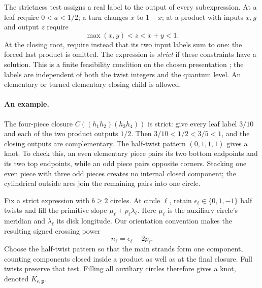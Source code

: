 The strictness test assigns a real label to the output of every
subexpression. At a leaf require $0<a<1/2$; a turn changes $x$ to
$1-x$; at a product with inputs $x,y$ and output $z$ require
\[
                \max(x,y)<z<x+y<1.
\]
At the closing root, require instead that its two input labels sum to
one: the forced last product is omitted. The expression is
\emph{strict} if these constraints have a solution. This is a finite
feasibility condition on the chosen presentation
\cite[Lemma 5.2]{Newton}; the labels are independent of both the twist
integers and the quantum level. An elementary or turned elementary
closing child is allowed.

\paragraph{An example.}
The four-piece closure $C((h_1h_2)(h_3h_4))$ is strict: give every
leaf label $3/10$ and each of the two product outputs $1/2$.
Then $3/10<1/2<3/5<1$, and the closing outputs are complementary.
The half-twist pattern $(0,1,1,1)$ gives a knot. To check this, an
even elementary piece pairs its two bottom endpoints and its two top
endpoints, while an odd piece pairs opposite corners. Stacking one
even piece with three odd pieces creates no internal closed component;
the cylindrical outside arcs join the remaining pairs into one circle.

Fix a strict expression with $b\ge2$ circles. At circle $\ell$, retain
$\epsilon_\ell\in\{0,1,-1\}$ half twists and fill the primitive slope
$\mu_\ell+p_\ell\lambda_\ell$. Here $\mu_\ell$ is the auxiliary
circle's meridian and $\lambda_\ell$ its disk longitude. Our orientation
convention makes the resulting signed crossing power
\begin{equation}\label{ca:n}
 n_\ell=\epsilon_\ell-2p_\ell.
\end{equation}
Choose the half-twist pattern so that the main strands form one
component, counting components closed inside a product as well as at
the final closure. Full twists preserve that test. Filling all auxiliary
circles therefore gives a knot, denoted $K_{\epsilon,\mathbf p}$.

